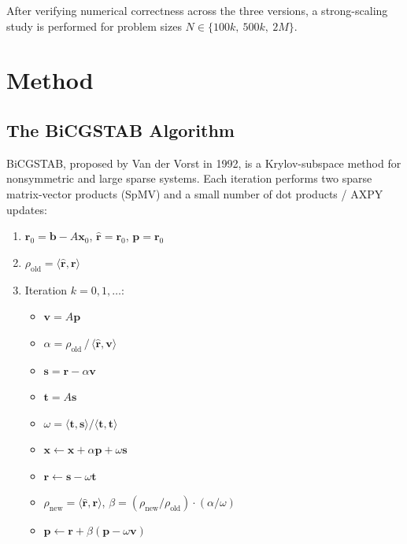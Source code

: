 \documentclass[11pt,a4paper]{article}
\begin{document}
After verifying numerical correctness across the three versions, a
strong-scaling study is performed for problem sizes
$N \in \{100k,\ 500k,\ 2M\}$.

\section{Method}

\subsection{The BiCGSTAB Algorithm}

BiCGSTAB, proposed by Van der Vorst in 1992, is a Krylov-subspace
method for nonsymmetric and large sparse systems. Each iteration
performs two sparse matrix-vector products (SpMV) and a small number
of dot products / AXPY updates:

\begin{enumerate}
    \item $\mathbf{r}_0 = \mathbf{b} - A\mathbf{x}_0$, \quad
          $\hat{\mathbf{r}} = \mathbf{r}_0$, \quad $\mathbf{p} = \mathbf{r}_0$
    \item $\rho_{\text{old}} = \langle \hat{\mathbf{r}}, \mathbf{r} \rangle$
    \item Iteration $k = 0, 1, \ldots$:
    \begin{itemize}
        \item $\mathbf{v} = A\mathbf{p}$
        \item $\alpha = \rho_{\text{old}} \,/\, \langle \hat{\mathbf{r}}, \mathbf{v} \rangle$
        \item $\mathbf{s} = \mathbf{r} - \alpha \mathbf{v}$
        \item $\mathbf{t} = A\mathbf{s}$
        \item $\omega = \langle \mathbf{t}, \mathbf{s} \rangle / \langle \mathbf{t}, \mathbf{t} \rangle$
        \item $\mathbf{x} \leftarrow \mathbf{x} + \alpha \mathbf{p} + \omega \mathbf{s}$
        \item $\mathbf{r} \leftarrow \mathbf{s} - \omega \mathbf{t}$
        \item $\rho_{\text{new}} = \langle \hat{\mathbf{r}}, \mathbf{r} \rangle$, \quad
              $\beta = (\rho_{\text{new}} / \rho_{\text{old}}) \cdot (\alpha / \omega)$
        \item $\mathbf{p} \leftarrow \mathbf{r} + \beta (\mathbf{p} - \omega \mathbf{v})$
    \end{itemize}
\end{enumerate}
\end{document}
